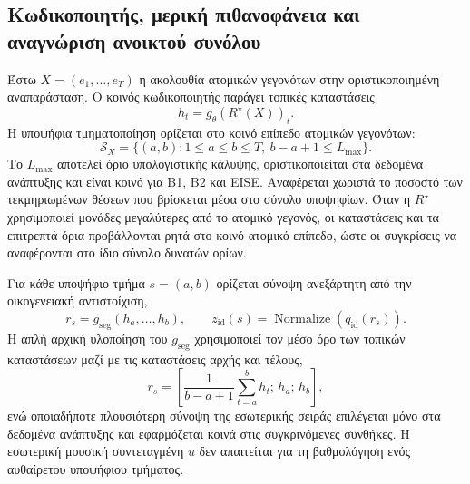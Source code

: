 \documentclass[11pt,a4paper]{article}
\begin{document}
\subsection{Κωδικοποιητής, μερική πιθανοφάνεια και αναγνώριση ανοικτού συνόλου}\label{app:eise-encoder}

Έστω $X=(e_1,\ldots,e_T)$ η ακολουθία ατομικών γεγονότων στην οριστικοποιημένη αναπαράσταση. Ο κοινός κωδικοποιητής παράγει τοπικές καταστάσεις
\[
h_t=g_{\theta}\!\left(R^{\star}(X)\right)_t.
\]
Η υποψήφια τμηματοποίηση ορίζεται στο κοινό επίπεδο ατομικών γεγονότων:
\[
\mathcal S_X=\{(a,b):1\le a\le b\le T,\ b-a+1\le L_{\max}\}.
\]
Το $L_{\max}$ αποτελεί όριο υπολογιστικής κάλυψης, οριστικοποιείται στα δεδομένα ανάπτυξης και είναι κοινό για B1, B2 και EISE. Αναφέρεται χωριστά το ποσοστό των τεκμηριωμένων θέσεων που βρίσκεται μέσα στο σύνολο υποψηφίων. Όταν η $R^\star$ χρησιμοποιεί μονάδες μεγαλύτερες από το ατομικό γεγονός, οι καταστάσεις και τα επιτρεπτά όρια προβάλλονται ρητά στο κοινό ατομικό επίπεδο, ώστε οι συγκρίσεις να αναφέρονται στο ίδιο σύνολο δυνατών ορίων.

Για κάθε υποψήφιο τμήμα $s=(a,b)$ ορίζεται σύνοψη ανεξάρτητη από την οικογενειακή αντιστοίχιση,
\[
r_s=g_{\mathrm{seg}}(h_a,\ldots,h_b),
\qquad
z_{\mathrm{id}}(s)=\operatorname{Normalize}\!\left(q_{\mathrm{id}}(r_s)\right).
\]
Η απλή αρχική υλοποίηση του $g_{\mathrm{seg}}$ χρησιμοποιεί τον μέσο όρο των τοπικών καταστάσεων μαζί με τις καταστάσεις αρχής και τέλους,
\[
r_s=\left[\frac{1}{b-a+1}\sum_{t=a}^{b}h_t;\,h_a;\,h_b\right],
\]
ενώ οποιαδήποτε πλουσιότερη σύνοψη της εσωτερικής σειράς επιλέγεται μόνο στα δεδομένα ανάπτυξης και εφαρμόζεται κοινά στις συγκρινόμενες συνθήκες. Η εσωτερική μουσική συντεταγμένη $u$ δεν απαιτείται για τη βαθμολόγηση ενός αυθαίρετου υποψήφιου τμήματος.
\end{document}
